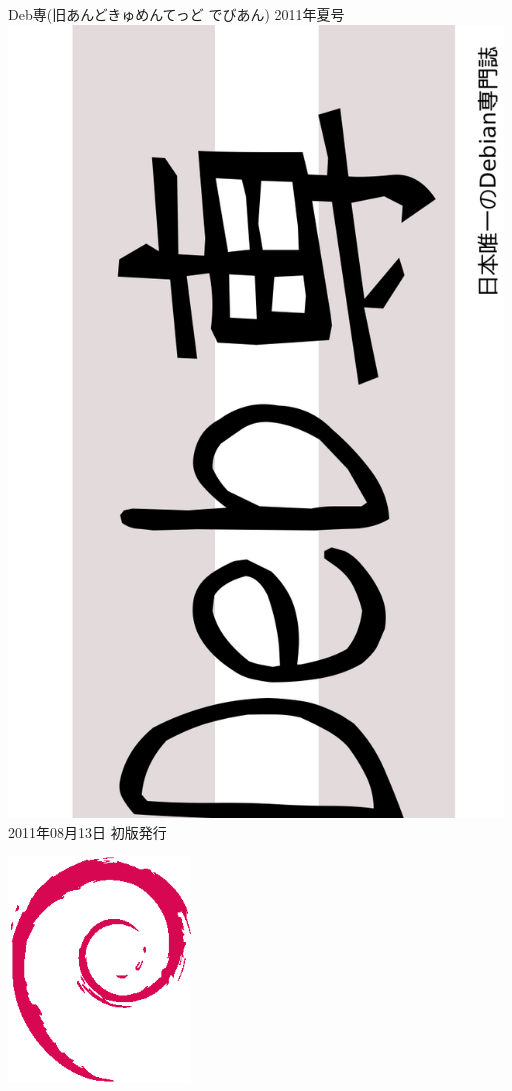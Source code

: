 \documentclass[mingoth,a4paper]{jsarticle}
\begin{document}
\begin{titlepage}
\thispagestyle{empty}

\vspace*{-2cm}
Deb専(旧あんどきゅめんてっど でびあん) 2011年夏号\\
\hspace*{-2cm}
\includegraphics[height=210mm,angle=270]{image2011-natsu/debsen.pdf}\\
\hfill 2011年08月13日 初版発行



\vspace*{-2cm}
\hfill{}\includegraphics[height=6cm]{image200502/openlogo-nd.eps}
\end{titlepage}
\end{document}
